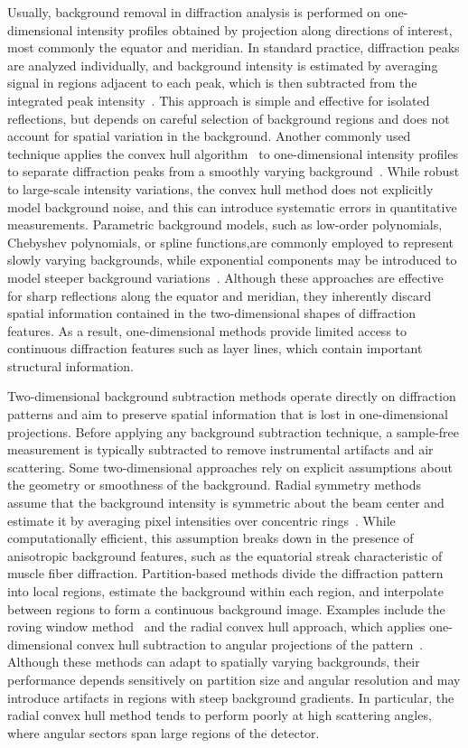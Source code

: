 \documentclass[iucr]{iucrjournals}
\begin{document}
Usually, background removal in diffraction analysis is performed on one-dimensional intensity profiles obtained by projection along directions of interest, most commonly the equator and meridian. In standard practice, diffraction peaks are analyzed individually, and background intensity is estimated by averaging signal in regions adjacent to each peak, which is then subtracted from the integrated peak intensity~\cite{NederKorsunskiy2018}. This approach is simple and effective for isolated reflections, but depends on careful selection of background regions and does not account for spatial variation in the background. Another commonly used technique applies the convex hull algorithm~\cite{jarvis1973convex_hull} to one-dimensional intensity profiles to separate diffraction peaks from a smoothly varying background~\cite{lee2019musclex}. While robust to large-scale intensity variations, the convex hull method does not explicitly model background noise, and this can introduce systematic errors in quantitative measurements. Parametric background models, such as low-order polynomials, Chebyshev polynomials, or spline functions,are commonly employed to represent slowly varying backgrounds, while exponential components may be introduced to model steeper background variations~\cite{rajkumar2007fibrefix}. Although these approaches are effective for sharp reflections along the equator and meridian, they inherently discard spatial information contained in the two-dimensional shapes of diffraction features. As a result, one-dimensional methods provide limited access to continuous diffraction features such as layer lines, which contain important structural information.

Two-dimensional background subtraction methods operate directly on diffraction patterns and aim to preserve spatial information that is lost in one-dimensional projections. Before applying any background subtraction technique, a sample-free measurement is typically subtracted to remove instrumental artifacts and air scattering. Some two-dimensional approaches rely on explicit assumptions about the geometry or smoothness of the background. Radial symmetry methods assume that the background intensity is symmetric about the beam center and estimate it by averaging pixel intensities over concentric rings~\cite{rajkumar2007fibrefix}. While computationally efficient, this assumption breaks down in the presence of anisotropic background features, such as the equatorial streak characteristic of muscle fiber diffraction. Partition-based methods divide the diffraction pattern into local regions, estimate the background within each region, and interpolate between regions to form a continuous background image. Examples include the roving window method~\cite{HeEtAl2007} and the radial convex hull approach, which applies one-dimensional convex hull subtraction to angular projections of the pattern~\cite{lee2019musclex}. Although these methods can adapt to spatially varying backgrounds, their performance depends sensitively on partition size and angular resolution and may introduce artifacts in regions with steep background gradients. In particular, the radial convex hull method tends to perform poorly at high scattering angles, where angular sectors span large regions of the detector.
\end{document}
